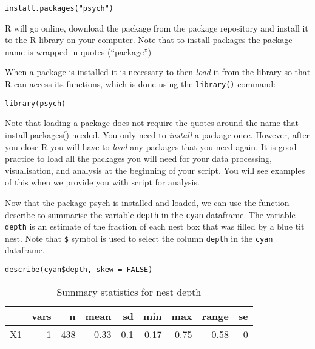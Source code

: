 \documentclass[
]{book}
\newenvironment{Shaded}{\begin{snugshade}}{\end{snugshade}}
\newcommand{\AttributeTok}[1]{\textcolor[rgb]{0.77,0.63,0.00}{#1}}
\newcommand{\ConstantTok}[1]{\textcolor[rgb]{0.00,0.00,0.00}{#1}}
\newcommand{\DecValTok}[1]{\textcolor[rgb]{0.00,0.00,0.81}{#1}}
\newcommand{\FunctionTok}[1]{\textcolor[rgb]{0.00,0.00,0.00}{#1}}
\newcommand{\NormalTok}[1]{#1}
\newcommand{\SpecialCharTok}[1]{\textcolor[rgb]{0.00,0.00,0.00}{#1}}
\newcommand{\StringTok}[1]{\textcolor[rgb]{0.31,0.60,0.02}{#1}}
\begin{document}
\texttt{install.packages("psych")}

R will go online, download the package from the package repository and
install it to the R library on your computer. Note that to install
packages the package name is wrapped in quotes (``package'')

When a package is installed it is necessary to then \emph{load} it from
the library so that R can access its functions, which is done using the
\texttt{library()} command:

\texttt{library(psych)}

Note that loading a package does not require the quotes around the name
that install.packages() needed. You only need to \emph{install} a
package once. However, after you close R you will have to \emph{load}
any packages that you need again. It is good practice to load all the
packages you will need for your data processing, visualisation, and
analysis at the beginning of your script. You will see examples of this
when we provide you with script for analysis.

Now that the package psych is installed and loaded, we can use the
function describe to summarise the variable \texttt{depth} in the
\texttt{cyan} dataframe. The variable \texttt{depth} is an estimate of
the fraction of each nest box that was filled by a blue tit nest. Note
that \texttt{\$} symbol is used to select the column \texttt{depth} in
the \texttt{cyan} dataframe.

\texttt{describe(cyan\$depth,\ skew\ =\ FALSE)}

\begin{Shaded}
\end{Shaded}

\begin{table}

\caption{\label{tab:nice-tab}Summary statistics for nest depth}
\centering
\begin{tabular}[t]{lrrrrrrrr}
\toprule
  & vars & n & mean & sd & min & max & range & se\\
\midrule
X1 & 1 & 438 & 0.33 & 0.1 & 0.17 & 0.75 & 0.58 & 0\\
\bottomrule
\end{tabular}
\end{table}
\end{document}
